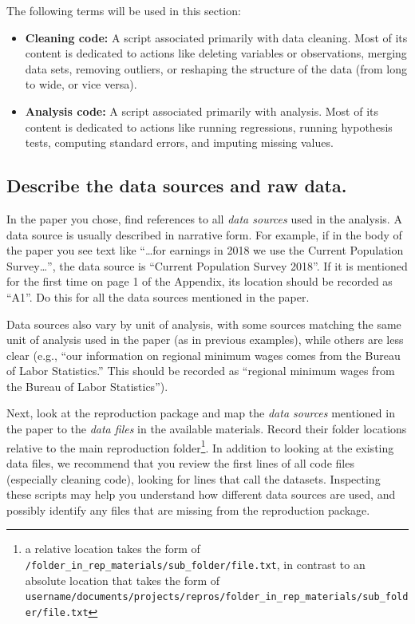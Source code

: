 \documentclass[]{book}
\begin{document}
The following terms will be used in this section:

\begin{itemize}
\item
  \textbf{Cleaning code:} A script associated primarily with data cleaning. Most of its content is dedicated to actions like deleting variables or observations, merging data sets, removing outliers, or reshaping the structure of the data (from long to wide, or vice versa).
\item
  \textbf{Analysis code:} A script associated primarily with analysis. Most of its content is dedicated to actions like running regressions, running hypothesis tests, computing standard errors, and imputing missing values.
\end{itemize}

\hypertarget{desc-sourc}{%
\subsection{Describe the data sources and raw data.}\label{desc-sourc}}

In the paper you chose, find references to all \emph{data sources} used in the analysis. A data source is usually described in narrative form. For example, if in the body of the paper you see text like ``\ldots{}for earnings in 2018 we use the Current Population Survey\ldots{}'', the data source is ``Current Population Survey 2018''. If it is mentioned for the first time on page 1 of the Appendix, its location should be recorded as ``A1''. Do this for all the data sources mentioned in the paper.

Data sources also vary by unit of analysis, with some sources matching the same unit of analysis used in the paper (as in previous examples), while others are less clear (e.g., ``our information on regional minimum wages comes from the Bureau of Labor Statistics.'' This should be recorded as ``regional minimum wages from the Bureau of Labor Statistics'').

Next, look at the reproduction package and map the \emph{data sources} mentioned in the paper to the \emph{data files} in the available materials. Record their folder locations relative to the main reproduction folder\footnote{a relative location takes the form of \texttt{/folder\_in\_rep\_materials/sub\_folder/file.txt}, in contrast to an absolute location that takes the form of \texttt{username/documents/projects/repros/folder\_in\_rep\_materials/sub\_folder/file.txt}}. In addition to looking at the existing data files, we recommend that you review the first lines of all code files (especially cleaning code), looking for lines that call the datasets. Inspecting these scripts may help you understand how different data sources are used, and possibly identify any files that are missing from the reproduction package.
\end{document}
